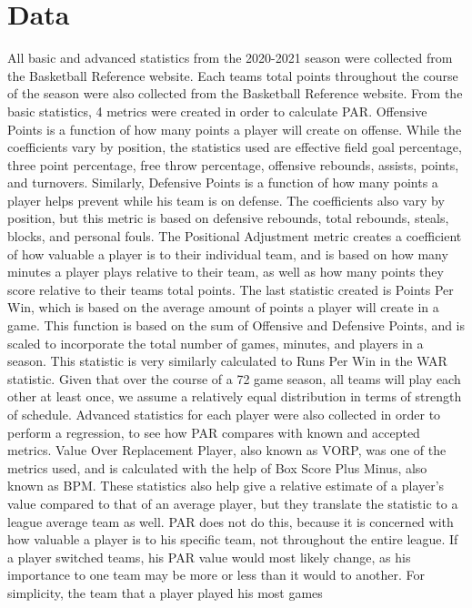 \documentclass[12pt]{article}
\begin{document}
\section{Data}
All basic and advanced statistics from the 2020-2021 season were collected from the Basketball Reference 
website. Each teams total points throughout the course of the season were also collected from the 
Basketball Reference website. From the basic statistics, 4 metrics were created in order to calculate PAR. 
Offensive Points is a function of how many points a player will create on offense. While the coefficients vary 
by position, the statistics used are effective field goal percentage, three point percentage, free throw 
percentage, offensive rebounds, assists, points, and turnovers. Similarly, Defensive Points is a function of 
how many points a player helps prevent while his team is on defense. The coefficients also vary by position, 
but this metric is based on defensive rebounds, total rebounds, steals, blocks, and personal fouls. The 
Positional Adjustment metric creates a coefficient of how valuable a player is to their individual team, and is 
based on how many minutes a player plays relative to their team, as well as how many points they score 
relative to their teams total points. The last statistic created is Points Per Win, which is based on the 
average amount of points a player will create in a game. This function is based on the sum of Offensive and 
Defensive Points, and is scaled to incorporate the total number of games, minutes, and players in a season. 
This statistic is very similarly calculated to Runs Per Win in the WAR statistic. Given that over the course of 
a 72 game season, all teams will play each other at least once, we assume a relatively equal distribution in 
terms of strength of schedule. Advanced statistics for each player were also collected in order to perform a 
regression, to see how PAR compares with known and accepted metrics. Value Over Replacement Player, 
also known as VORP, was one of the metrics used, and is calculated with the help of Box Score Plus 
Minus, also known as BPM. These statistics also help give a relative estimate of a player's value compared 
to that of an average player, but they translate the statistic to a league average team as well. PAR does not 
do this, because it is concerned with how valuable a player is to his specific team, not throughout the entire 
league. If a player switched teams, his PAR value would most likely change, as his importance to one team 
may be more or less than it would to another. For simplicity, the team that a player played his most games 
\end{document}
